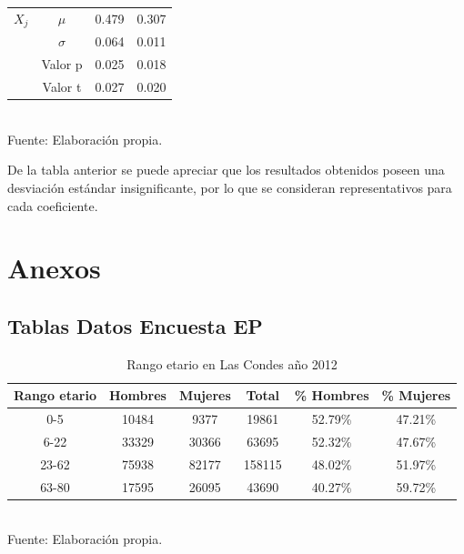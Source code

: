 \documentclass[12pt]{article} %
\begin{document}
\begin{table}[H]
\begin{tabular}{|c|c|c|c|}
    $X_j$ & \multicolumn{1}{|c|}{\(\mu\)} & \multicolumn{1}{|c|}{0.479} & \multicolumn{1}{|c|}{0.307} \\ \cline{2-4}
    & \multicolumn{1}{|c|}{\(\sigma\)} & \multicolumn{1}{|c|}{0.064} & \multicolumn{1}{|c|}{0.011} \\ \cline{2-4}
    & \multicolumn{1}{|c|}{Valor p} & \multicolumn{1}{|c|}{0.025} & \multicolumn{1}{|c|}{0.018} \\ \cline{2-4}
    & \multicolumn{1}{|c|}{Valor t} & \multicolumn{1}{|c|}{0.027} & \multicolumn{1}{|c|}{0.020} \\ \hline
    \end{tabular}
    \\Fuente: Elaboración propia.
\end{table}


De la tabla anterior se puede apreciar que los resultados obtenidos poseen una desviación estándar insignificante, por lo que se 
consideran representativos para cada coeficiente.

\section{Anexos}

\subsection{Tablas Datos Encuesta EP}

\begin{table}[H]
    \centering
    \caption{Rango etario en Las Condes año 2012}
    \begin{tabular}{|c|c|c|c|c|c|}
    \hline
    \textbf{Rango etario} & \textbf{Hombres} & \textbf{Mujeres} & \textbf{Total} & \textbf{\% Hombres} & \textbf{\% Mujeres} \\ \hline
    0-5 & 10484 & 9377 & 19861 & 52.79\% & 47.21\% \\ \hline
    6-22 & 33329 & 30366 & 63695 & 52.32\% & 47.67\% \\ \hline
    23-62 & 75938 & 82177 & 158115 & 48.02\% & 51.97\% \\ \hline
    63-80 & 17595 & 26095 & 43690 & 40.27\% & 59.72\% \\ \hline
    \end{tabular}
    \label{Cuadro 4}
    \\Fuente: Elaboración propia.
\end{table}
\end{document}
